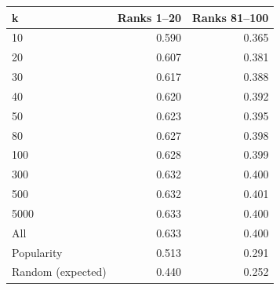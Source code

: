 \begin{tabular}{lrr}
\toprule
k & Ranks 1--20 & Ranks 81--100 \\
\midrule
10 & 0.590 & 0.365 \\
20 & 0.607 & 0.381 \\
30 & 0.617 & 0.388 \\
40 & 0.620 & 0.392 \\
50 & 0.623 & 0.395 \\
80 & 0.627 & 0.398 \\
100 & 0.628 & 0.399 \\
300 & 0.632 & 0.400 \\
500 & 0.632 & 0.401 \\
5000 & 0.633 & 0.400 \\
\midrule
All & 0.633 & 0.400 \\
Popularity & 0.513 & 0.291 \\
Random (expected) & 0.440 & 0.252 \\
\bottomrule
\end{tabular}
